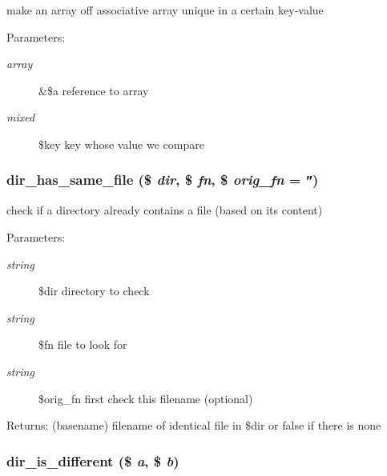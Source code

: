 make an array off associative array unique in a certain key-value

\begin{Desc}
\item[Parameters:]
\begin{description}
\item[{\em array}]\&\$a reference to array \item[{\em mixed}]\$key key whose value we compare \end{description}
\end{Desc}
\hypertarget{util_8inc_8php_7f3e06b0a6f405290cb4d7990b8ac5c6}{
\subsubsection[{dir\_\-has\_\-same\_\-file}]{\setlength{\rightskip}{0pt plus 5cm}dir\_\-has\_\-same\_\-file (\$ {\em dir}, \/  \$ {\em fn}, \/  \$ {\em orig\_\-fn} = {\tt ''})}}
\label{util_8inc_8php_7f3e06b0a6f405290cb4d7990b8ac5c6}


check if a directory already contains a file (based on its content)

\begin{Desc}
\item[Parameters:]
\begin{description}
\item[{\em string}]\$dir directory to check \item[{\em string}]\$fn file to look for \item[{\em string}]\$orig\_\-fn first check this filename (optional) \end{description}
\end{Desc}
\begin{Desc}
\item[Returns:](basename) filename of identical file in \$dir or false if there is none \end{Desc}
\hypertarget{util_8inc_8php_6309f576f2611237288d0dd3eed09db3}{
\subsubsection[{dir\_\-is\_\-different}]{\setlength{\rightskip}{0pt plus 5cm}dir\_\-is\_\-different (\$ {\em a}, \/  \$ {\em b})}}
\label{util_8inc_8php_6309f576f2611237288d0dd3eed09db3}


